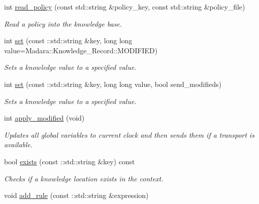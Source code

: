 \begin{DoxyCompactItemize}
int \hyperlink{classMadara_1_1Knowledge__Engine_1_1Knowledge__Base__Impl_a67f9baeea14beee8a5654a2f6ec9b7f8}{read\_\-policy} (const std::string \&policy\_\-key, const std::string \&policy\_\-file)
\begin{DoxyCompactList}\small\item\em Read a policy into the knowledge base. \item\end{DoxyCompactList}\item 
int \hyperlink{classMadara_1_1Knowledge__Engine_1_1Knowledge__Base__Impl_a8e3331e99069e1c2176e4c7519e1cf54}{set} (const ::std::string \&key, long long value=Madara::Knowledge\_\-Record::MODIFIED)
\begin{DoxyCompactList}\small\item\em Sets a knowledge value to a specified value. \item\end{DoxyCompactList}\item 
int \hyperlink{classMadara_1_1Knowledge__Engine_1_1Knowledge__Base__Impl_acf9f55b95e43df61074c8f498013c9e6}{set} (const ::std::string \&key, long long value, bool send\_\-modifieds)
\begin{DoxyCompactList}\small\item\em Sets a knowledge value to a specified value. \item\end{DoxyCompactList}\item 
int \hyperlink{classMadara_1_1Knowledge__Engine_1_1Knowledge__Base__Impl_ad615376a5c5e0c520c107048d8dffdc2}{apply\_\-modified} (void)
\begin{DoxyCompactList}\small\item\em Updates all global variables to current clock and then sends them if a transport is available. \item\end{DoxyCompactList}\item 
bool \hyperlink{classMadara_1_1Knowledge__Engine_1_1Knowledge__Base__Impl_a0146e6d96eb50fb5a3aa5fbd037f33d8}{exists} (const ::std::string \&key) const 
\begin{DoxyCompactList}\small\item\em Checks if a knowledge location exists in the context. \item\end{DoxyCompactList}\item 
void \hyperlink{classMadara_1_1Knowledge__Engine_1_1Knowledge__Base__Impl_a384a9c37275867099b94854af3372e6c}{add\_\-rule} (const ::std::string \&expression)

\end{DoxyCompactItemize}
